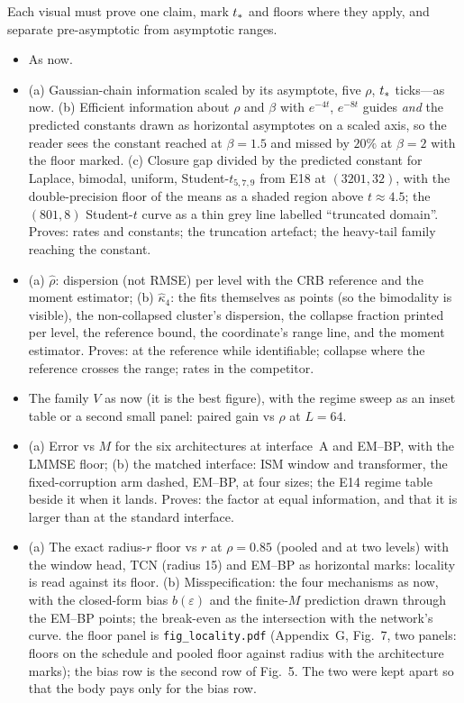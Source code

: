 Each visual must prove one claim, mark $t_\ast$ and floors where they apply, and separate pre-asymptotic from asymptotic ranges.

\begin{itemize}
\item {} As now.
\item {} (a) Gaussian-chain information scaled by its asymptote, five $\rho$, $t_\ast$ ticks---as now. (b) Efficient information about $\rho$ and $\beta$ with $e^{-4t}$, $e^{-8t}$ guides \emph{and} the predicted constants drawn as horizontal asymptotes on a scaled axis, so the reader sees the constant reached at $\beta=1.5$ and missed by $20\%$ at $\beta=2$ with the floor marked. (c) Closure gap divided by the predicted constant for Laplace, bimodal, uniform, Student-$t_{5,7,9}$ from E18 at $(3201,32)$, with the double-precision floor of the means as a shaded region above $t\approx4.5$; the $(801,8)$ Student-$t$ curve as a thin grey line labelled ``truncated domain''. Proves: rates and constants; the truncation artefact; the heavy-tail family reaching the constant.
\item {} (a) $\hat\rho$: dispersion (not RMSE) per level with the CRB reference and the moment estimator; (b) $\hat\kappa_4$: the fits themselves as points (so the bimodality is visible), the non-collapsed cluster's dispersion, the collapse fraction printed per level, the reference bound, the coordinate's range line, and the moment estimator. Proves: at the reference while identifiable; collapse where the reference crosses the range; rates in the competitor.
\item {} The family $V$ as now (it is the best figure), with the regime sweep as an inset table or a second small panel: paired gain vs $\rho$ at $L=64$.
\item {} (a) Error vs $M$ for the six architectures at interface~A and EM--BP, with the LMMSE floor; (b) the matched interface: ISM window and transformer, the fixed-corruption arm dashed, EM--BP, at four sizes; the E14 regime table beside it when it lands. Proves: the factor at equal information, and that it is larger than at the standard interface.
\item {} (a) The exact radius-$r$ floor vs $r$ at $\rho=0.85$ (pooled and at two levels) with the window head, TCN (radius 15) and EM--BP as horizontal marks: locality is read against its floor. (b) Misspecification: the four mechanisms as now, with the closed-form bias $b(\varepsilon)$ and the finite-$M$ prediction drawn through the EM--BP points; the break-even as the intersection with the network's curve.  the floor panel is \texttt{fig\_locality.pdf} (Appendix~G, Fig.~7, two panels: floors on the schedule and pooled floor against radius with the architecture marks); the bias row is the second row of Fig.~5. The two were kept apart so that the body pays only for the bias row.

\end{itemize}
